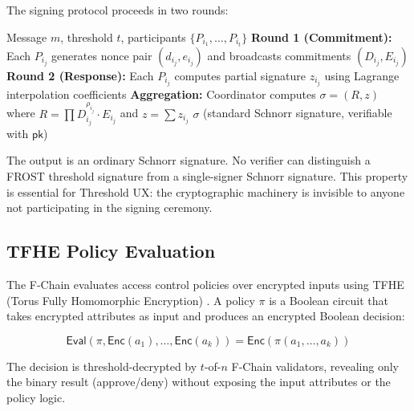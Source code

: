 The signing protocol proceeds in two rounds:

\begin{algorithm}[H]
\caption{FROST Threshold Signing (simplified)}
\label{alg:frost}
\begin{algorithmic}[1]
\Require Message $m$, threshold $t$, participants $\{P_{i_1}, \ldots, P_{i_t}\}$
\State \textbf{Round 1 (Commitment):} Each $P_{i_j}$ generates nonce pair $(d_{i_j}, e_{i_j})$ and broadcasts commitments $(D_{i_j}, E_{i_j})$
\State \textbf{Round 2 (Response):} Each $P_{i_j}$ computes partial signature $z_{i_j}$ using Lagrange interpolation coefficients
\State \textbf{Aggregation:} Coordinator computes $\sigma = (R, z)$ where $R = \prod D_{i_j}^{\rho_{i_j}} \cdot E_{i_j}$ and $z = \sum z_{i_j}$
\State \Return $\sigma$ (standard Schnorr signature, verifiable with $\mathsf{pk}$)
\end{algorithmic}
\end{algorithm}

The output is an ordinary Schnorr signature. No verifier can distinguish
a FROST threshold signature from a single-signer Schnorr signature. This
property is essential for Threshold UX: the cryptographic machinery is
invisible to anyone not participating in the signing ceremony.

\subsection{TFHE Policy Evaluation}

The F-Chain evaluates access control policies over encrypted inputs using
TFHE (Torus Fully Homomorphic Encryption) \cite{chillotti2020tfhe}. A
policy $\pi$ is a Boolean circuit that takes encrypted attributes as input
and produces an encrypted Boolean decision:

\begin{equation}
    \mathsf{Eval}(\pi, \mathsf{Enc}(a_1), \ldots, \mathsf{Enc}(a_k)) = \mathsf{Enc}(\pi(a_1, \ldots, a_k))
\end{equation}

The decision is threshold-decrypted by $t$-of-$n$ F-Chain validators,
revealing only the binary result (approve/deny) without exposing the
input attributes or the policy logic.

